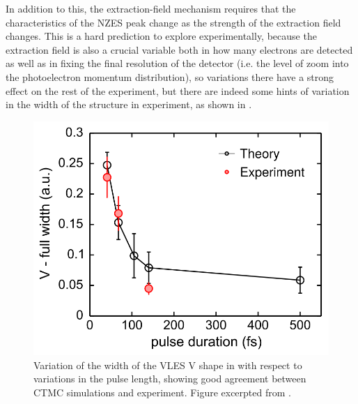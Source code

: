 In addition to this, the extraction-field mechanism requires that the characteristics of the NZES peak change as the strength of the extraction field changes. This is a hard prediction to explore experimentally, because the extraction field is also a crucial variable both in how many electrons are detected as well as in fixing the final resolution of the detector (i.e. the level of zoom into the photoelectron momentum distribution), so variations there have a strong effect on the rest of the experiment, but there are indeed some hints of variation in the width of the structure in experiment, as shown in . 


\begin{figure}[!t]
  \centering
  \includegraphics[scale=1]{6-LES/Figures/figure6P.png}
  \caption[
  Variation of the width of the VLES V shape with respect to the pulse length, as observed and CTMC-simulated by B. Wolter et al.
  ]{
  Variation of the width of the VLES V shape in  with respect to variations in the pulse length, showing good agreement between CTMC simulations and experiment.
  Figure excerpted from .
  }
\label{f6-wolter-scaling-original-figure}
\end{figure}




